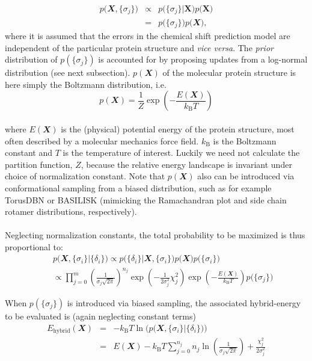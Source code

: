 \begin{eqnarray}
p\Big(\mathbfit X, \{\sigma_j\} \Big) & \propto & p\Big(\{\sigma_j\} \Big| \mathbf X \Big) p\Big(\mathbf X\Big)\\
& = & p\Big(\{\sigma_j\} \Big) p\Big(\mathbfit X\Big),
\end{eqnarray}
where it is assumed that the errors in the chemical shift prediction model are independent of the particular protein structure and \textit{vice versa}. The \textit{prior} distribution of $p\left(\{\sigma_j\} \right)$ is accounted for by proposing updates from a log-normal distribution (see next subsection). $p(\mathbfit X)$ of the molecular protein structure is here simply the Boltzmann distribution, i.e. 
\begin{equation}
p(\mathbfit X) = \frac{1}{Z}\exp{\left(-\frac{E(\mathbfit X)}{k_\mathrm{B}T}\right)}
\end{equation}\\
where $E(\mathbfit X)$ is the (physical) potential energy of the protein structure, most often described by a molecular mechanics force field. $k_\mathrm{B}$ is the Boltzmann constant and $T$ is the temperature of interest. Luckily we need not calculate the partition function, $Z$, because the relative energy landscape is invariant under choice of normalization constant. Note that $p(\mathbfit X)$ also can be introduced via conformational sampling from a biased distribution, such as for example TorusDBN or BASILISK (mimicking the Ramachandran plot and side chain rotamer distributions, respectively). 
\\\\
Neglecting normalization constants, the total probability to be maximized is thus proportional to:
\begin{eqnarray}
&&p\Big( \mathbfit X, \{\sigma_i\} \Big| \{\delta_i\} \Big)  \propto  p\Big( \{\delta_i\} \Big| \mathbfit X, \{\sigma_i\}\Big) p\Big(\mathbfit X\Big) p\Big(\{\sigma_i\} \Big) \\
&&\propto   \prod_{j=0}^{m} \left(\frac{1}{\sigma_j \sqrt{2\pi}}\right)^{n_j} \exp{ \left(  - \frac{1}{2\sigma_j^2} \chi_j^2 \right) } \exp{\left(-\frac{E(\mathbfit X)}{k_\mathrm{B}T}\right)} p\Big(\{\sigma_j\} \Big) 
\end{eqnarray}

When $p(\{\sigma_j\})$ is introduced via biased sampling, the associated hybrid-energy to be evaluated is (again neglecting constant terms) 
\begin{eqnarray}
E_{\mathrm{hybrid}}\left(\mathbfit{X}\right) &=&- k_\mathrm{B}T \ln{} \Big(p\Big( \mathbfit X, \{\sigma_i\} \Big| \{\delta_i\} \Big)\Big) \\
&= & E(\mathbfit X) - k_\mathrm{B}T \sum_{j=0}^{n_j}n_j \ln{} \left(\frac{1}{\sigma_j \sqrt{2\pi}} \right) + \frac{\chi_j^2}{2\sigma_j^2}
\end{eqnarray}


